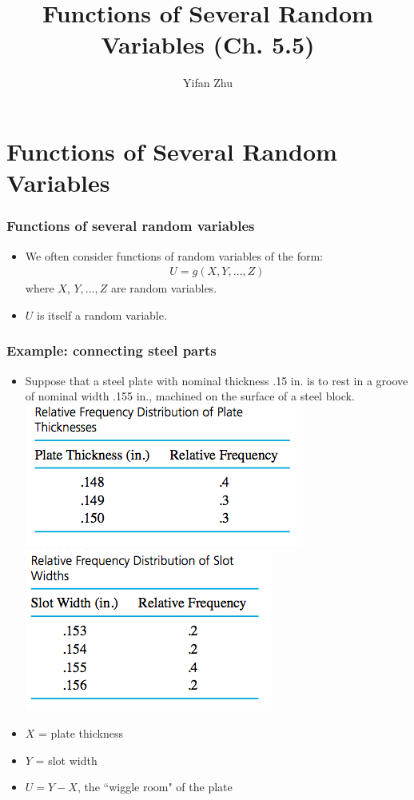\documentclass[handout]{beamer}\usepackage[]{graphicx}\usepackage[]{color}
\title{Functions of Several Random Variables (Ch. 5.5)}
\author{Yifan Zhu}
\date{}
\institute{Iowa State University}
\providecommand{\q}{$\quad$ \newline}
\numberwithin{equation}{section}
\begin{document}
\begin{frame}
\titlepage
 \end{frame}
 

\section{Functions of Several Random Variables}

\begin{frame}
\frametitle{Functions of several random variables}
\begin{itemize}
\pause \item We often consider functions of random variables of the form:
\pause \begin{align*}
U = g(X, Y, \ldots, Z)
\end{align*}
\pause where $X$, $Y, \ldots, Z$ are random variables.
\pause \item $U$ is itself a random variable.
\end{itemize}
\end{frame}


\begin{frame}
\frametitle{Example: connecting steel parts}
\begin{itemize}
\item Suppose that a steel plate with nominal thickness .15 in. is to rest in a groove of nominal width .155 in., machined on the surface of a steel block. \q \q
{} \includegraphics{../../fig/platet.png}
 \includegraphics{../../fig/slott.png}
\pause \item $X$ = plate thickness
\pause \item $Y$ = slot width
\pause \item $U=Y-X$, the ``wiggle room" of the plate
\end{itemize}
\end{frame}
\end{document}
